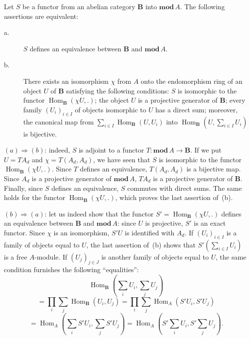\begin{corollary}
Let $S$ be a functor from an abelian category $\mathbf B$ into
$\mathbf{mod}\,A$.  The following assertions are equivalent:
\begin{description}
\item[\normalfont a.] $S$ defines an equivalence between $\mathbf B$
      and $\mathbf{mod}\,A$.
\item[\normalfont b.] There exists an isomorphism $\chi$ from $A$ onto
      the endomorphism ring of an object $U$ of $\mathbf B$ satisfying
      the following conditions: $S$ is isomorphic to the functor
      $\operatorname{Hom}_{\mathbf B}(\chi U,.)$; the object $U$ is a
      projective generator of $\mathbf B$; every family
      $(U_i)_{i\in I}$ of objects isomorphic to $U$ has a direct sum;
      moreover, the canonical map from
      $\sum_{i\in I}\operatorname{Hom}_{\mathbf B}(U,U_i)$ into
      $\operatorname{Hom}_{\mathbf B}(U,\sum_{i\in I}U_i)$ is bijective.
\end{description}
\end{corollary}

$(a)\Rightarrow(b)$: indeed, $S$ is adjoint to a functor
$T\colon\mathbf{mod}\,A\to\mathbf B$.  If we put $U=TA_d$ and
$\chi=T(A_d,A_d)$, we have seen that $S$ is isomorphic to the functor
$\operatorname{Hom}_{\mathbf B}(\chi U,.)$.  Since $T$ defines an
equivalence, $T(A_d,A_d)$ is a bijective map.  Since $A_d$ is a
projective generator of $\mathbf{mod}\,A$, $TA_d$ is a projective
generator of $\mathbf B$.  Finally, since $S$ defines an equivalence,
$S$ commutes with direct sums.  The same holds for the functor
$\operatorname{Hom}_{\mathbf B}(\chi U,.)$, which proves the last
assertion of~(b).

$(b)\Rightarrow(a)$: let us indeed show that the functor
$S'=\operatorname{Hom}_{\mathbf B}(\chi U,.)$ defines an equivalence
between $\mathbf B$ and $\mathbf{mod}\,A$: since $U$ is projective,
$S'$ is an exact functor.  Since $\chi$ is an isomorphism, $S'U$ is
identified with $A_d$.  If $(U_i)_{i\in I}$ is a family of objects
equal to $U$, the last assertion of~(b) shows that
$S'(\sum_{i\in I}U_i)$ is a free $A$-module.  If $(U_j)_{j\in J}$ is
another family of objects equal to $U$, the same condition furnishes
the following ``equalities'':
\[
\operatorname{Hom}_{\mathbf B}\!\left(\sum_i U_i,\sum_j U_j\right)
\]
\[
=\prod_i\sum_j\operatorname{Hom}_{\mathbf B}(U_i,U_j)
  =\prod_i\sum_j\operatorname{Hom}_A(S'U_i,S'U_j)
\]
\[
=\operatorname{Hom}_A\!\left(\sum_i S'U_i,\sum_j S'U_j\right)
  =\operatorname{Hom}_A\!\left(S'\sum_i U_i,S'\sum_j U_j\right).
\]

